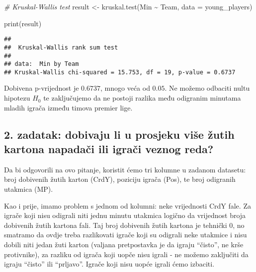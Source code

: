 \documentclass[
]{article}
\newenvironment{Shaded}{\begin{snugshade}}{\end{snugshade}}
\newcommand{\AttributeTok}[1]{\textcolor[rgb]{0.77,0.63,0.00}{#1}}
\newcommand{\CommentTok}[1]{\textcolor[rgb]{0.56,0.35,0.01}{\textit{#1}}}
\newcommand{\DecValTok}[1]{\textcolor[rgb]{0.00,0.00,0.81}{#1}}
\newcommand{\FunctionTok}[1]{\textcolor[rgb]{0.00,0.00,0.00}{#1}}
\newcommand{\NormalTok}[1]{#1}
\newcommand{\OtherTok}[1]{\textcolor[rgb]{0.56,0.35,0.01}{#1}}
\newcommand{\SpecialCharTok}[1]{\textcolor[rgb]{0.00,0.00,0.00}{#1}}
\newcommand{\StringTok}[1]{\textcolor[rgb]{0.31,0.60,0.02}{#1}}
\begin{document}
\begin{Shaded}
\begin{Highlighting}[]
\CommentTok{\# Kruskal{-}Wallis test}
\NormalTok{result }\OtherTok{\textless{}{-}} \FunctionTok{kruskal.test}\NormalTok{(Min }\SpecialCharTok{\textasciitilde{}}\NormalTok{ Team, }\AttributeTok{data =}\NormalTok{ young\_players)}

\FunctionTok{print}\NormalTok{(result)}
\end{Highlighting}
\end{Shaded}

\begin{verbatim}
## 
##  Kruskal-Wallis rank sum test
## 
## data:  Min by Team
## Kruskal-Wallis chi-squared = 15.753, df = 19, p-value = 0.6737
\end{verbatim}

Dobivena p-vrijednost je \(0.6737\), mnogo veća od \(0.05\). Ne možemo
odbaciti nultu hipotezu \(H_0\) te zaključujemo da ne postoji razlika
među odigranim minutama mladih igrača između timova premier lige.

\hypertarget{zadatak-dobivaju-li-u-prosjeku-viux161e-ux17eutih-kartona-napadaux10di-ili-igraux10di-veznog-reda}{%
\subsection{2. zadatak: dobivaju li u prosjeku više žutih kartona
napadači ili igrači veznog
reda?}\label{zadatak-dobivaju-li-u-prosjeku-viux161e-ux17eutih-kartona-napadaux10di-ili-igraux10di-veznog-reda}}

Da bi odgovorili na ovo pitanje, koristit ćemo tri kolumne u zadanom
datasetu: broj dobivenih žutih karton (CrdY), poziciju igrača (Pos), te
broj odigranih utakmica (MP).

Kao i prije, imamo problem s jednom od kolumni: neke vrijednosti CrdY
fale. Za igrače koji nisu odigrali niti jednu minutu utakmica logično da
vrijednost broja dobivenih žutih kartona fali. Taj broj dobivenih žutih
kartona je tehnički 0, no smatramo da ovdje treba razlikovati igrače
koji su odigrali neke utakmice i nisu dobili niti jedan žuti karton
(valjana pretpostavka je da igraju ``čisto'', ne krše protivnike), za
razliku od igrača koji uopče nisu igrali - ne možemo zaključiti da
igraju ``čisto'' ili ``prljavo''. Igrače koji nisu uopće igrali ćemo
izbaciti.

\begin{Shaded}
\end{Shaded}
\end{document}
